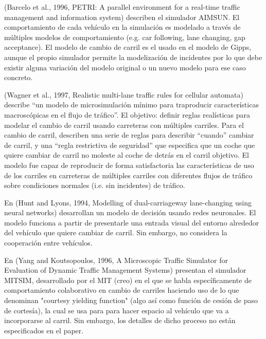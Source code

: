 (Barcelo et al., 1996, PETRI: A parallel environment for a real-time traffic management and information system) describen el simulador AIMSUN. El comportamiento de cada vehículo en la simulación es modelado a través de múltiples modelos de comportamiento (e.g. car following, lane changing, gap acceptance). El modelo de cambio de carril es el usado en el modelo de Gipps, aunque el propio simulador permite la modelización de incidentes por lo que debe existir alguna variación del modelo original o un nuevo modelo para ese caso concreto.

(Wagner et al., 1997, Realistic multi-lane traffic rules for cellular automata) describe \enquote{un modelo de microsimulación mínimo para traproducir características macroscópicas en el flujo de tráfico}. El objetivo: definir reglas realísticas para modelar el cambio de carril usando carreteras con múltiples carriles. Para el cambio de carril, describen una serie de reglas para describir \enquote{cuando} cambiar de carril, y una \enquote{regla restrictiva de seguridad} que especifica que un coche que quiere cambiar de carril no moleste al coche de detrás en el carril objetivo. El modelo fue capaz de reproducir de forma satisfactoria las características de uso de los carriles en carreteras de múltiples carriles con diferentes flujos de tráfico sobre condiciones normales (i.e. sin incidentes) de tráfico.

En (Hunt and Lyons, 1994, Modelling of dual-carriageway lane-changing using neural networks) desarrollan un modelo de decisión usando redes neuronales. El modelo funciona a partir de presentarle una entrada visual del entorno alrededor del vehículo que quiere cambiar de carril. Sin embargo, no considera la cooperación entre vehículos.

En (Yang and Koutsopoulos, 1996, A Microscopic Traffic Simulator for Evaluation of Dynamic Traffic Management Systems) presentan el simulador MITSIM, desarrollado por el MIT (creo) en el que se habla específicamente de comportamiento colaborativo en cambio de carriles haciendo uso de lo que denominan "courtesy yielding function" (algo así como función de cesión de paso de cortesía), la cual se usa para para hacer espacio al vehículo que va a incorporarse al carril. Sin embargo, los detalles de dicho proceso no están especificados en el paper.

